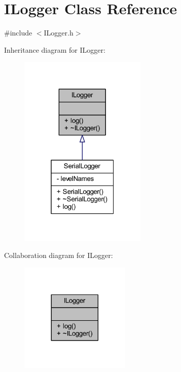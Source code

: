 \hypertarget{class_i_logger}{}\section{I\+Logger Class Reference}
\label{class_i_logger}


{\ttfamily \#include $<$I\+Logger.\+h$>$}



Inheritance diagram for I\+Logger\+:
\nopagebreak
\begin{figure}[H]
\begin{center}
\leavevmode
\includegraphics[width=172pt]{class_i_logger__inherit__graph}
\end{center}
\end{figure}


Collaboration diagram for I\+Logger\+:
\nopagebreak
\begin{figure}[H]
\begin{center}
\leavevmode
\includegraphics[width=149pt]{class_i_logger__coll__graph}
\end{center}
\end{figure}
